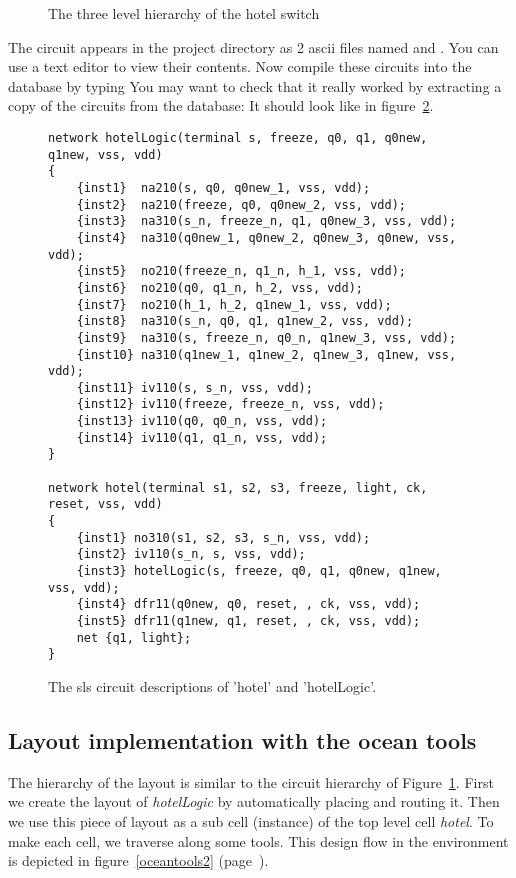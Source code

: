 \begin{figure}[hbt]
\centerline{}
\caption{The three level hierarchy of the hotel switch}
\label{f-hotel-hier}
\end{figure}

The circuit appears in the project directory as 2 ascii files named
 and . You can use a text editor to view
their contents. Now compile these circuits into the database by typing
You may want to check that it really worked by extracting a copy of the
circuits from the database:
It should look like in figure~\ref{hotelLogic}.
\begin{figure}
{\small
\begin{verbatim}
network hotelLogic(terminal s, freeze, q0, q1, q0new, q1new, vss, vdd)
{
    {inst1}  na210(s, q0, q0new_1, vss, vdd);
    {inst2}  na210(freeze, q0, q0new_2, vss, vdd);
    {inst3}  na310(s_n, freeze_n, q1, q0new_3, vss, vdd);
    {inst4}  na310(q0new_1, q0new_2, q0new_3, q0new, vss, vdd);
    {inst5}  no210(freeze_n, q1_n, h_1, vss, vdd);
    {inst6}  no210(q0, q1_n, h_2, vss, vdd);
    {inst7}  no210(h_1, h_2, q1new_1, vss, vdd);
    {inst8}  na310(s_n, q0, q1, q1new_2, vss, vdd);
    {inst9}  na310(s, freeze_n, q0_n, q1new_3, vss, vdd);
    {inst10} na310(q1new_1, q1new_2, q1new_3, q1new, vss, vdd);
    {inst11} iv110(s, s_n, vss, vdd);
    {inst12} iv110(freeze, freeze_n, vss, vdd);
    {inst13} iv110(q0, q0_n, vss, vdd);
    {inst14} iv110(q1, q1_n, vss, vdd);
}

network hotel(terminal s1, s2, s3, freeze, light, ck, reset, vss, vdd)
{
    {inst1} no310(s1, s2, s3, s_n, vss, vdd);
    {inst2} iv110(s_n, s, vss, vdd);
    {inst3} hotelLogic(s, freeze, q0, q1, q0new, q1new, vss, vdd);
    {inst4} dfr11(q0new, q0, reset, , ck, vss, vdd);
    {inst5} dfr11(q1new, q1, reset, , ck, vss, vdd);
    net {q1, light};
}
\end{verbatim}
}
\caption{ 
The sls circuit descriptions of 'hotel' and 'hotelLogic'.}
\label{hotelLogic}
\end{figure}
\subsection{Layout implementation with the {\sc ocean} tools}
The hierarchy of the layout is similar to the circuit hierarchy of
Figure~\ref{f-hotel-hier}. First we create the layout of {\sl hotelLogic} by
automatically placing and routing it. Then
we use this piece of layout as a sub cell (instance) of the top level cell {\sl
hotel}. To make each cell, we traverse along some tools. This design flow in
the  environment is depicted in figure~\ref{oceantools2}
(page~\pageref{oceantools2}).

